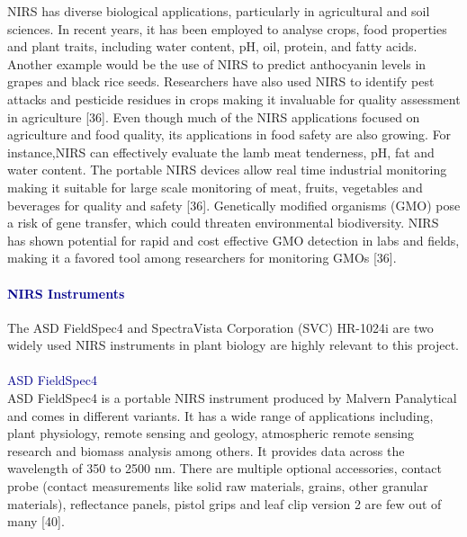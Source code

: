 \documentclass[12pt,a4paper]{report}
\begin{document}
NIRS has diverse biological applications, particularly in agricultural and soil sciences. In recent years, it has been employed to analyse crops, food properties and plant traits, including water content, pH, oil, protein, and fatty acids. Another example would be the use of NIRS to predict anthocyanin levels in grapes and black rice seeds. Researchers have also used NIRS to identify pest attacks and pesticide residues in crops making it invaluable for quality assessment 
in agriculture [36]. Even though much of the NIRS applications focused on agriculture and food quality, its applications in food safety are also growing. For instance,NIRS can effectively evaluate the lamb meat tenderness, pH, fat and water content. The portable NIRS devices allow real time industrial monitoring making it suitable for large scale monitoring of meat, fruits, vegetables and beverages for quality and safety [36]. Genetically modified organisms (GMO) pose a risk of 
gene transfer, which could threaten environmental biodiversity. NIRS has shown potential for rapid and cost effective GMO detection in labs and fields, making it a favored tool among researchers for monitoring GMOs [36]. \\

\paragraph{\textbf{\textcolor{darkblue}{NIRS Instruments}}}
The ASD FieldSpec4 and SpectraVista Corporation (SVC) HR-1024i are two widely used NIRS instruments in plant biology are highly relevant to this project. \\ 

\\
\textcolor{darkblue}{ASD FieldSpec4} \\
ASD FieldSpec4 is a portable NIRS instrument produced by  Malvern Panalytical and comes in different variants. It has a wide range of applications including, plant physiology, remote sensing and geology, atmospheric remote sensing research and biomass analysis among others. It provides data across the wavelength of 350 to 2500 nm. There are multiple optional accessories, contact probe (contact measurements like solid raw materials, grains, other granular materials), reflectance panels, pistol grips and leaf clip version 2 are few out of many [40]. \\
\end{document}

